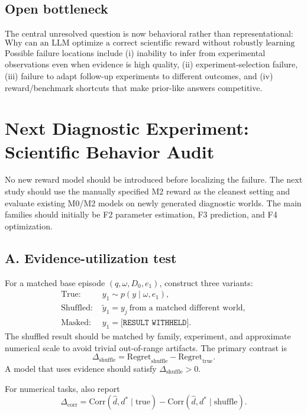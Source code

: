 \documentclass[11pt]{article}
\begin{document}
\subsection{Open bottleneck}
The central unresolved question is now behavioral rather than representational:
\[
\boxed{
\text{Why can an LLM optimize a correct scientific reward without robustly learning to use experimental evidence?}
}
\]
Possible failure locations include (i) inability to infer from experimental observations even when evidence is high quality, (ii) experiment-selection failure, (iii) failure to adapt follow-up experiments to different outcomes, and (iv) reward/benchmark shortcuts that make prior-like answers competitive.

\section{Next Diagnostic Experiment: Scientific Behavior Audit}
No new reward model should be introduced before localizing the failure. The next study should use the manually specified M2 reward as the cleanest setting and evaluate existing M0/M2 models on newly generated diagnostic worlds. The main families should initially be F2 parameter estimation, F3 prediction, and F4 optimization.

\subsection{A. Evidence-utilization test}
For a matched base episode $(q,\omega,D_0,e_1)$, construct three variants:
\begin{align*}
\text{True: }& y_1\sim p(y\mid\omega,e_1),\\
\text{Shuffled: }& \widetilde y_1=y_j\ \text{from a matched different world},\\
\text{Masked: }& y_1=\texttt{[RESULT WITHHELD]}.
\end{align*}
The shuffled result should be matched by family, experiment, and approximate numerical scale to avoid trivial out-of-range artifacts. The primary contrast is
\[
\Delta_{\mathrm{shuffle}}
=\mathrm{Regret}_{\mathrm{shuffle}}-\mathrm{Regret}_{\mathrm{true}}.
\]
A model that uses evidence should satisfy $\Delta_{\mathrm{shuffle}}>0$.

For numerical tasks, also report
\[
\Delta_{\mathrm{corr}}
=\mathrm{Corr}(\widehat d,d^*\mid\mathrm{true})
-\mathrm{Corr}(\widehat d,d^*\mid\mathrm{shuffle}).
\]
\end{document}
